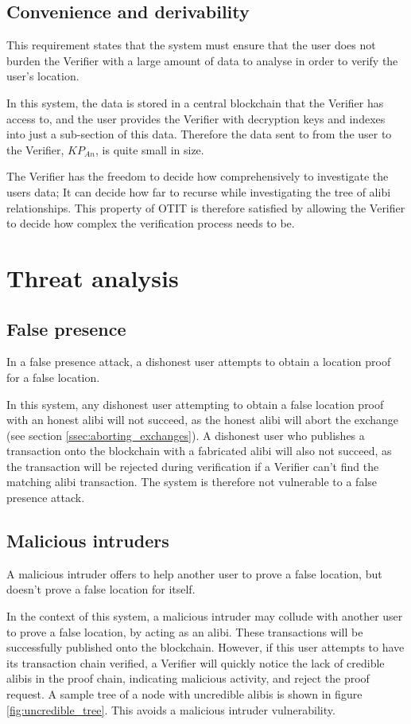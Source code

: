 \subsection{Convenience and derivability}
This requirement states that the system must ensure that the user does not burden the Verifier with a large amount of data to analyse in order to verify the user's location.

In this system, the data is stored in a central blockchain that the Verifier has access to, and the user provides the Verifier  with decryption keys and indexes into just a sub-section of this data. Therefore the data sent to from the user to the Verifier, $KP_{An}$, is quite small in size.

The Verifier has the freedom to decide how comprehensively to investigate the users data; It can decide how far to recurse while investigating the tree of alibi relationships. This property of OTIT is therefore satisfied by allowing the Verifier to decide how complex the verification process needs to be.

\section{Threat analysis}
\subsection{False presence}
In a false presence attack, a dishonest user attempts to obtain a location proof for a false location.

In this system, any dishonest user attempting to obtain a false location proof with an honest alibi will not succeed, as the honest alibi will abort the exchange (see section \ref{ssec:aborting_exchanges}). A dishonest user who publishes a transaction onto the blockchain with a fabricated alibi will also not succeed, as the transaction will be rejected during verification if a Verifier can't find the matching alibi transaction. The system is therefore not vulnerable to a false presence attack.

\subsection{Malicious intruders}
A malicious intruder offers to help another user to prove a false location, but doesn't prove a false location for itself.

In the context of this system, a malicious intruder may collude with another user to prove a false location, by acting as an alibi. These transactions will be successfully published onto the blockchain. However, if this user attempts to have its transaction chain verified, a Verifier will quickly notice the lack of credible alibis in the proof chain, indicating malicious activity, and reject the proof request. A sample tree of a node with uncredible alibis is shown in figure \ref{fig:uncredible_tree}. This avoids a malicious intruder vulnerability.

